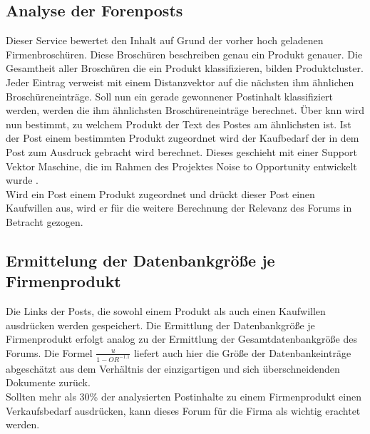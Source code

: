 \subsection{Analyse der Forenposts}
Dieser Service bewertet den Inhalt auf Grund der vorher hoch geladenen Firmenbroschüren. Diese Broschüren beschreiben genau ein Produkt genauer. Die Gesamtheit aller Broschüren die ein Produkt klassifizieren, bilden Produktcluster. Jeder Eintrag verweist mit einem Distanzvektor auf die nächsten ihm ähnlichen Broschüreneinträge. Soll nun ein gerade gewonnener Postinhalt klassifiziert werden, werden die ihm ähnlichsten Broschüreneinträge berechnet. Über knn wird nun bestimmt, zu welchem Produkt der Text des Postes am ähnlichsten ist. Ist der Post einem bestimmten Produkt zugeordnet wird der Kaufbedarf der in dem Post zum Ausdruck gebracht wird berechnet. Dieses geschieht mit einer Support Vektor Maschine, die im Rahmen des Projektes Noise to Opportunity entwickelt wurde \cite{n2o}.\\
Wird ein Post einem Produkt zugeordnet und drückt dieser Post einen Kaufwillen aus, wird er für die weitere Berechnung der Relevanz des Forums in Betracht gezogen.
\subsection{Ermittelung der Datenbankgröße je Firmenprodukt}
Die Links der Posts, die sowohl einem Produkt als auch einen Kaufwillen ausdrücken werden gespeichert. Die Ermittlung der Datenbankgröße je Firmenprodukt erfolgt analog zu der Ermittlung der Gesamtdatenbankgröße des Forums. Die Formel \(\frac{u}{1-OR^{-1.1}}\) \cite{lu2008efficient} liefert auch hier die Größe der Datenbankeinträge abgeschätzt aus dem Verhältnis der einzigartigen und sich überschneidenden Dokumente zurück.\\
Sollten mehr als 30\% der analysierten Postinhalte zu einem Firmenprodukt einen Verkaufsbedarf ausdrücken, kann dieses Forum für die Firma als wichtig erachtet werden.

\newpage

